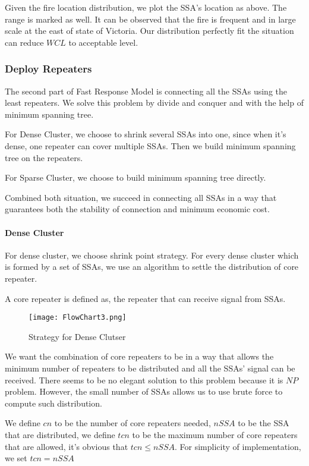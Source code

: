 \documentclass[../main]{subfiles}
\begin{document}
Given the fire location distribution, we plot the SSA's location as
above. The range is marked as well. It can be observed that the fire is
frequent and in large scale at the east of state of Victoria. Our
distribution perfectly fit the situation can reduce \(WCL\) to
acceptable level.

\subsubsection{Deploy Repeaters}

The second part of Fast Response Model is connecting all the SSAs using
the least repeaters. We solve this problem by divide and conquer and
with the help of minimum spanning tree.

For Dense Cluster, we choose to shrink several SSAs into one, since when
it's dense, one repeater can cover multiple SSAs. Then we build minimum
spanning tree on the repeaters.

For Sparse Cluster, we choose to build minimum spanning tree directly.

Combined both situation, we succeed in connecting all SSAs in a way that
guarantees both the stability of connection and minimum economic cost.

\paragraph{Dense Cluster}

For dense cluster, we choose shrink point strategy. For every dense
cluster which is formed by a set of SSAs, we use an algorithm to settle
the distribution of core repeater.

A core repeater is defined as, the repeater that can receive signal from
SSAs.

\begin{figure}[h!]
      \texttt{[image: FlowChart3.png]}
      \caption{Strategy for Dense Clutser}
    \end{figure}

We want the combination of core repeaters to be in a way that allows the
minimum number of repeaters to be distributed and all the SSAs' signal
can be received. There seems to be no elegant solution to this problem
because it is \(NP\) problem. However, the small number of SSAs allows
us to use brute force to compute such distribution.

We define \(cn\) to be the number of core repeaters needed, \(nSSA\) to
be the SSA that are distributed, we define \(tcn\) to be the maximum
number of core repeaters that are allowed, it's obvious that
\(tcn \le nSSA\). For simplicity of implementation, we set \(tcn=nSSA\)
\end{document}

